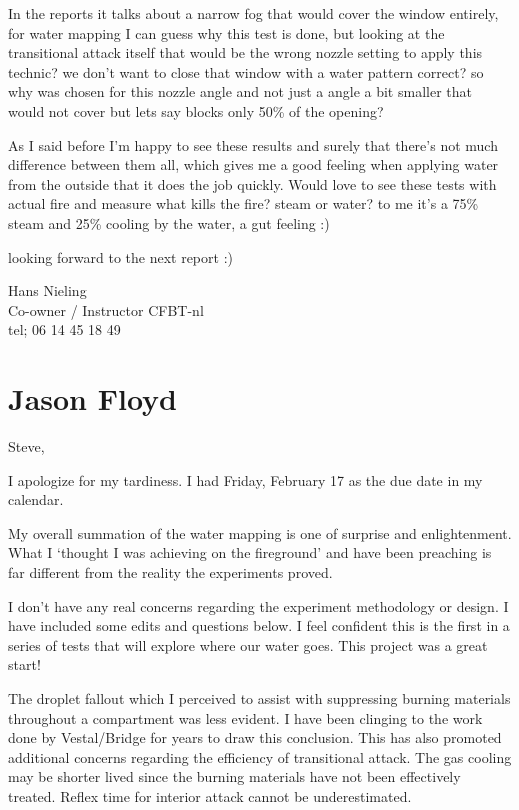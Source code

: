\documentclass[12pt,oneside]{book}
\begin{document}
\begin{appendix}
In the reports it talks about a narrow fog that would cover the window entirely, for water mapping I can guess why this test is done, but looking at the transitional attack itself that would be the wrong nozzle setting to apply this technic? we don’t want to close that window with a water pattern correct? so why was chosen for this nozzle angle and not just a angle a bit smaller that would not cover but lets say blocks only 50\% of the opening?
 
As I said before I’m happy to see these results and surely that there’s not much difference between them all, which gives me a good feeling when applying water from the outside that it does the job quickly.
Would love to see these tests with actual fire and measure what kills the fire? steam or water? to me it’s a 75\% steam and 25\% cooling by the water, a gut feeling :)
 
looking forward to the next report :)
 

Hans Nieling \\
Co-owner / Instructor CFBT-nl \\
tel; 06 14 45 18 49 \\

\section{Jason Floyd}

Steve, 

I apologize for my tardiness. I had Friday, February 17 as the due date in my calendar.
 
My overall summation of the water mapping is one of surprise and enlightenment. What I `thought I was achieving on the fireground' and have been preaching is far different from the reality the experiments proved.
 
I don’t have any real concerns regarding the experiment methodology or design. I have included some edits and questions below. I feel confident this is the first in a series of tests that will explore where our water goes. This project was a great start!
 
The droplet fallout which I perceived to assist with suppressing burning materials throughout a compartment was less evident. I have been clinging to the work done by Vestal/Bridge for years to draw this conclusion. This has also promoted additional concerns regarding the efficiency of transitional attack. The gas cooling may be shorter lived since the burning materials have not been effectively treated. Reflex time for interior attack cannot be underestimated.
 

\end{appendix}
\end{document}
